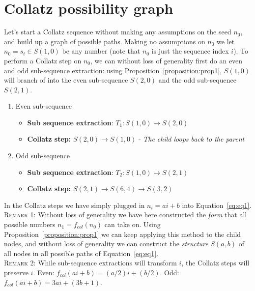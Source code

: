 \documentclass{article}
\theoremstyle{definition}
\begin{document}
\section{Collatz possibility graph}
Let's start a Collatz sequence without making any assumptions on the seed $n_0$, and build up a graph of possible paths. Making no assumptions on $n_0$ we let $n_0=s_i\in S(1,0)$ be any number (note that $n_0$ is just the sequence index $i$). To perform a Collatz step on $n_0$, we can without loss of generality first do an even and odd sub-sequence extraction: using Proposition~\ref{proposition:prop1}, $S(1,0)$ will branch of into the even sub-sequence $S(2,0)$ and the odd sub-sequence $S(2,1)$.
\begin{enumerate}
    \item
    Even sub-sequence
    \begin{itemize}
        \item
        \textbf{Sub sequence extraction}: $T_1: S(1,0) \longmapsto S(2,0)$
        \item \textbf{Collatz step:} $S(2,0) \longrightarrow S(1,0)$ - \textit{The child loops back to the parent}
    \end{itemize}
    \item
    Odd sub-sequence
    \begin{itemize}
        \item
        \textbf{Sub sequence extraction}: $T_2: S(1,0) \longmapsto S(2,1)$
        \item \textbf{Collatz step:} $S(2,1) \longrightarrow S(6,4) \longrightarrow S(3,2)$
    \end{itemize}
\end{enumerate}
%
In the Collatz steps we have simply plugged in $n_i=ai+b$ into Equation~\ref{eq:eq1}.
%
\\[.4cm]
%
\textsc{Remark 1:} Without loss of generality we have here constructed the \textit{form} that all possible numbers $n_1 = f_{col}(n_0)$ can take on. Using Proposition~\ref{proposition:prop1} we can keep applying this method to the child nodes, and without loss of generality we can construct the \textit{structure} $S(a,b)$ of all nodes in all possible paths of Equation~\ref{eq:eq1}.
%
\\[.4cm]
%
\textsc{Remark 2:} While sub-sequence extractions will transform $i$, the Collatz steps will preserve $i$. Even: $f_{col}(ai+b) = (a/2)i+(b/2)$. Odd: $f_{col}(ai+b)=3ai + (3b+1)$.
\end{document}
